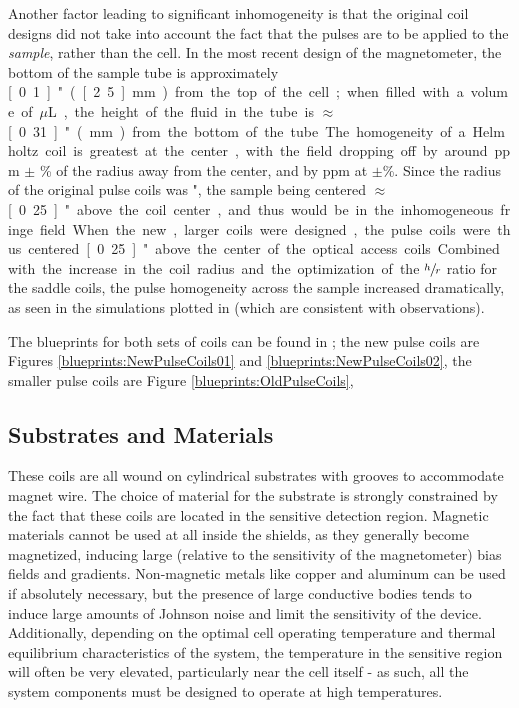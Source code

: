 \documentclass[PaulGanssle-Thesis.tex]{subfiles}
\begin{document}
Another factor leading to significant inhomogeneity is that the original coil designs did not take into account the fact that the pulses are to be applied to the \textit{sample}, rather than the cell. In the most recent design of the magnetometer, the bottom of the sample tube is approximately \unit[0.1]{"} (\unit[2.5]{mm}) from the top of the cell; when filled with a volume of \unit[100]{$\mu$L}, the height of the fluid in the tube is $\approx$ \unit[0.31]{"} (\unit[8]{mm}) from the bottom of the tube. The homogeneity of a Helmholtz coil is greatest at the center, with the field dropping off by around \unit[150]{ppm} $\pm$ \unit[10]{\%} of the radius away from the center, and by \unit[2300]{ppm} at $\pm$\unit[20]{\%}. Since the radius of the original pulse coils was \unit[1]{"}, the sample being centered $\approx$ \unit[0.25]{"} above the coil center, and thus would be in the inhomogeneous fringe field. When the new, larger coils were designed, the pulse coils were thus centered \unit[0.25]{"} above the center of the optical access coils.  Combined with the increase in the coil radius and the optimization of the $\sfrac{h}{r}$ ratio for the saddle coils, the pulse homogeneity across the sample increased dramatically, as seen in the simulations plotted in  (which are consistent with observations).

The blueprints for both sets of coils can be found in ; the new pulse coils are Figures \ref{blueprints:NewPulseCoils01} and \ref{blueprints:NewPulseCoils02}, the smaller pulse coils are Figure \ref{blueprints:OldPulseCoils},

\subsection{Substrates and Materials}
\label{nmr.pulsecoil.substrates}
These coils are all wound on cylindrical substrates with grooves to accommodate magnet wire. The choice of material for the substrate is strongly constrained by the fact that these coils are located in the sensitive detection region. Magnetic materials cannot be used at all inside the shields, as they generally become magnetized, inducing large (relative to the sensitivity of the magnetometer) bias fields and gradients. Non-magnetic metals like copper and aluminum can be used if absolutely necessary, but the presence of large conductive bodies tends to induce large amounts of Johnson noise and limit the sensitivity of the device. Additionally, depending on the optimal cell operating temperature and thermal equilibrium characteristics of the system, the temperature in the sensitive region will often be very elevated, particularly near the cell itself - as such, all the system components must be designed to operate at high temperatures.
\end{document}
